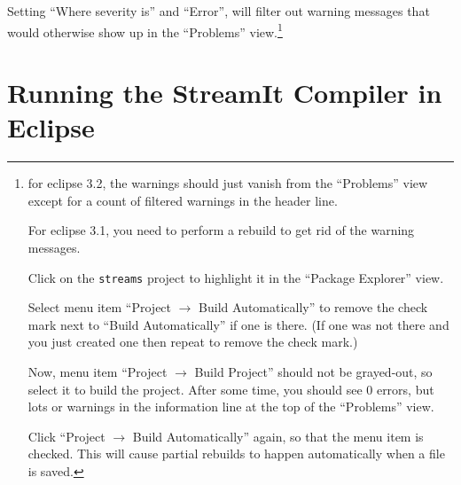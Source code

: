\documentclass[11pt]{article}
\begin{document}
Setting  ``Where severity is'' and ``Error'', will filter out warning
messages that would otherwise show up in the ``Problems'' view.\footnote{%
for eclipse 3.2, the warnings should just vanish from the ``Problems''
view except for a count of filtered warnings in the header line.

For eclipse 3.1, you need to perform a rebuild to get rid of the
warning messages.
 
Click on the {\tt streams} project to highlight it in the
``Package Explorer'' view.

Select menu item ``Project $\rightarrow$ Build Automatically'' to
remove the check mark next to ``Build Automatically'' if one is there.
(If one was not there and you just created one then repeat to remove
the check mark.)

Now, menu item ``Project $\rightarrow$ Build Project'' should not be
grayed-out, so select it to build the project.
After some time,
you should see 0 errors, but lots or warnings in the information line
at the top of the ``Problems'' view.

Click ``Project $\rightarrow$ Build Automatically'' again, so that the
menu item is checked. This will cause partial rebuilds to happen
automatically when a file is saved.
}



\section{Running the StreamIt Compiler in Eclipse}
\end{document}
